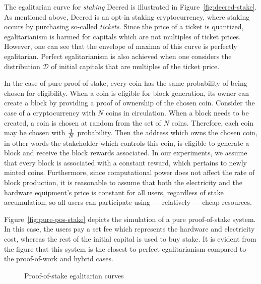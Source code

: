 The egalitarian curve for \emph{staking} Decred is illustrated in
Figure~\ref{fig:decred-stake}.
As mentioned above, Decred is an opt-in staking cryptocurrency, where staking
occurs by purchasing so-called \emph{tickets}. Since the price of a ticket is
quantized, egalitarianism is harmed for capitals which are not multiples of
ticket prices. However, one can see that the envelope of maxima of this curve
is perfectly egalitarian. Perfect egalitarianism is also achieved when one
considers the distribution $\mathcal{D}$ of initial capitals that are multiples
of the ticket price.

In the case of pure proof-of-stake, every coin has the same probability of
being chosen for eligibility. When a coin is eligible for block generation, its
owner can create a block by providing a proof of ownership of the chosen coin.
Consider the case of a cryptocurrency with $N$ coins in circulation. When a
block needs to be created, a coin is chosen at random from the set of $N$
coins. Therefore, each coin may be chosen with $1 \over N$ probability. Then
the address which owns the chosen coin, in other words the stakeholder which
controls this coin, is eligible to generate a block and receive the block
rewards associated. In our experiments, we assume that every block is
associated with a constant reward, which pertains to newly minted coins.
Furthermore, since computational power does not affect the rate of block
production, it is reasonable to assume that both the electricity and the
hardware equipment's price is constant for all users, regardless of stake
accumulation, so all users can participate using --- relatively --- cheap
resources.

Figure~\ref{fig:pure-pos-stake} depicts the simulation of a pure proof-of-stake
system. In this case, the users pay a set fee which represents the hardware and
electricity cost, whereas the rest of the initial capital is used to buy stake.
It is evident from the figure that this system is the closest to perfect
egalitarianism compared to the proof-of-work and hybrid cases.

\begin{figure}
  \caption{Proof-of-stake egalitarian curves}
  \label{fig:egalitarian_curves_pos}
\end{figure}

